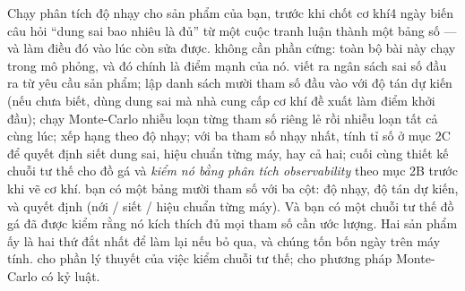 \documentclass[../../vslam.tex]{subfiles}
\begin{document}
\begin{ungdung}
\end{ungdung}

\begin{duan}{Chạy phân tích độ nhạy cho sản phẩm của bạn, trước khi chốt cơ khí}{4 ngày}
\dmt biến câu hỏi ``dung sai bao nhiêu là đủ'' từ một cuộc tranh luận thành một bảng số --- và làm điều đó vào lúc còn sửa được.
\ddl không cần phần cứng: toàn bộ bài này chạy trong mô phỏng, và đó chính là điểm mạnh của nó.
\dbc viết ra ngân sách sai số đầu ra từ yêu cầu sản phẩm; lập danh sách mười tham số đầu vào với độ tán dự kiến (nếu chưa biết, dùng dung sai mà nhà cung cấp cơ khí đề xuất làm điểm khởi đầu); chạy Monte-Carlo nhiễu loạn từng tham số riêng lẻ rồi nhiễu loạn tất cả cùng lúc; xếp hạng theo độ nhạy; với ba tham số nhạy nhất, tính tỉ số ở mục 2C để quyết định siết dung sai, hiệu chuẩn từng máy, hay cả hai; cuối cùng thiết kế chuỗi tư thế cho đồ gá và \emph{kiểm nó bằng phân tích observability} theo mục 2B trước khi vẽ cơ khí.
\dxk bạn có một bảng mười tham số với ba cột: độ nhạy, độ tán dự kiến, và quyết định (nới / siết / hiệu chuẩn từng máy). Và bạn có một chuỗi tư thế đồ gá đã được kiểm rằng nó kích thích đủ mọi tham số cần ước lượng. Hai sản phẩm ấy là hai thứ đắt nhất để làm lại nếu bỏ qua, và chúng tốn bốn ngày trên máy tính.
\dnv {} cho phần lý thuyết của việc kiểm chuỗi tư thế;  cho phương pháp Monte-Carlo có kỷ luật.
\end{duan}
\end{document}
